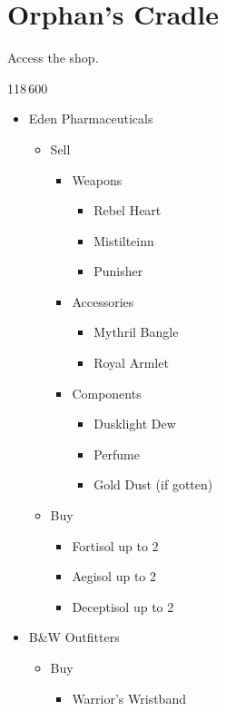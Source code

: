 \chapter{Orphan's Cradle}

Access the shop.

\begin{shop}{118\,600}
	\begin{itemize}
		\item Eden Pharmaceuticals
			\begin{itemize}
				\item Sell
					\begin{itemize}
						\item Weapons
							\begin{itemize}
								\item Rebel Heart
								\item Mistilteinn
								\item Punisher
							\end{itemize}
						\item Accessories
							\begin{itemize}
								\item Mythril Bangle
								\item Royal Armlet
							\end{itemize}
						\item Components
							\begin{itemize}
								\item Dusklight Dew
								\item Perfume
								\item Gold Dust (if gotten)
							\end{itemize}
					\end{itemize}
				\item Buy
					\begin{itemize}
						\item Fortisol up to 2
						\item Aegisol up to 2
						\item Deceptisol up to 2
					\end{itemize}
			\end{itemize}
		\item B\&W Outfitters
			\begin{itemize}
				\item Buy
					\begin{itemize}
						\item Warrior's Wristband
					\end{itemize}

\end{itemize}
\end{itemize}
\end{shop}
